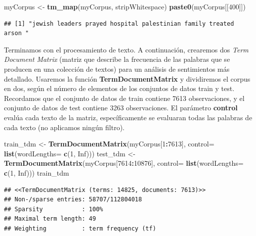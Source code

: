 \documentclass[
]{article}
\newenvironment{Shaded}{\begin{snugshade}}{\end{snugshade}}
\newcommand{\DataTypeTok}[1]{\textcolor[rgb]{0.13,0.29,0.53}{#1}}
\newcommand{\DecValTok}[1]{\textcolor[rgb]{0.00,0.00,0.81}{#1}}
\newcommand{\KeywordTok}[1]{\textcolor[rgb]{0.13,0.29,0.53}{\textbf{#1}}}
\newcommand{\NormalTok}[1]{#1}
\newcommand{\OperatorTok}[1]{\textcolor[rgb]{0.81,0.36,0.00}{\textbf{#1}}}
\newcommand{\OtherTok}[1]{\textcolor[rgb]{0.56,0.35,0.01}{#1}}
\newcommand{\StringTok}[1]{\textcolor[rgb]{0.31,0.60,0.02}{#1}}
\begin{document}
\begin{Shaded}
\begin{Highlighting}[]
\NormalTok{myCorpus <-}\StringTok{ }\KeywordTok{tm_map}\NormalTok{(myCorpus, stripWhitespace)}
\KeywordTok{paste0}\NormalTok{(myCorpus[[}\DecValTok{400}\NormalTok{]])}
\end{Highlighting}
\end{Shaded}

\begin{verbatim}
## [1] "jewish leaders prayed hospital palestinian family treated arson "
\end{verbatim}

Terminamos con el procesamiento de texto. A continuación, crearemos dos
\emph{Term Document Matrix} (matriz que describe la frecuencia de las
palabras que se producen en una colección de textos) para un análisis de
sentimientos más detallado. Usaremos la función
\textbf{TermDocumentMatrix} y dividiremos el corpus en dos, según el
número de elementos de los conjuntos de datos train y test. Recordamos
que el conjunto de datos de train contiene 7613 observaciones, y el
conjunto de datos de test contiene 3263 observaciones. El parámetro
\textbf{control} evalúa cada texto de la matriz, específicamente se
evaluaran todas las palabras de cada texto (no aplicamos ningún filtro).

\begin{Shaded}
\begin{Highlighting}[]
\NormalTok{train_tdm <-}\StringTok{ }\KeywordTok{TermDocumentMatrix}\NormalTok{(myCorpus[}\DecValTok{1}\OperatorTok{:}\DecValTok{7613}\NormalTok{], }
                                \DataTypeTok{control=} \KeywordTok{list}\NormalTok{(}\DataTypeTok{wordLengths=} \KeywordTok{c}\NormalTok{(}\DecValTok{1}\NormalTok{, }\OtherTok{Inf}\NormalTok{)))}
\NormalTok{test_tdm <-}\StringTok{ }\KeywordTok{TermDocumentMatrix}\NormalTok{(myCorpus[}\DecValTok{7614}\OperatorTok{:}\DecValTok{10876}\NormalTok{], }
                               \DataTypeTok{control=} \KeywordTok{list}\NormalTok{(}\DataTypeTok{wordLengths=} \KeywordTok{c}\NormalTok{(}\DecValTok{1}\NormalTok{, }\OtherTok{Inf}\NormalTok{)))}
\NormalTok{train_tdm}
\end{Highlighting}
\end{Shaded}

\begin{verbatim}
## <<TermDocumentMatrix (terms: 14825, documents: 7613)>>
## Non-/sparse entries: 58707/112804018
## Sparsity           : 100%
## Maximal term length: 49
## Weighting          : term frequency (tf)
\end{verbatim}
\end{document}
